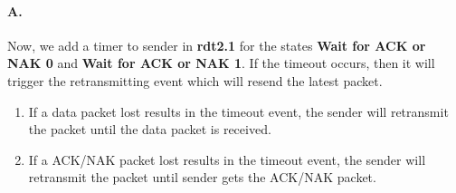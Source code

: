 \paragraph{A.}
Now, we add a timer to sender in \textbf{rdt2.1} for the states \textbf{Wait for ACK or NAK 0} and \textbf{Wait for ACK or NAK 1}.
If the timeout occurs, then it will trigger the retransmitting event which will resend the latest packet.
\begin{enumerate}
	\item If a data packet lost results in the timeout event, the sender will retransmit the packet until the data packet is received.
	\item If a ACK/NAK packet lost results in the timeout event, the sender will retransmit the packet until sender gets the ACK/NAK packet.
\end{enumerate}